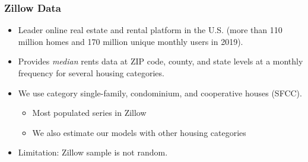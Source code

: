 \documentclass[aspectratio=169, t]{beamer}
\begin{document}
\begin{frame}[label = zillow_data]
    \frametitle{Zillow Data}
    
    \begin{itemize}
        \item Leader online real estate and rental platform in the U.S. {\small (more 
        than 110 million homes and 170 million unique monthly users in 2019).}
        
        \vspace{2mm} \item
        Provides \textit{median} rents data at ZIP code, county, and state levels 
        at a monthly frequency for several housing categories.
        
        \pause
        \vspace{2mm} \item
        We use category single-family, condominium, and cooperative houses (SFCC).
        \begin{itemize}
            \item Most populated series in Zillow
            \item We also estimate our models with other housing categories
        \end{itemize}
        
        \vspace{2mm} \item
        Limitation: Zillow sample is not random.

        \hyperlink{zillow_pop_density}{}

    \end{itemize}
\end{frame}
\end{document}
